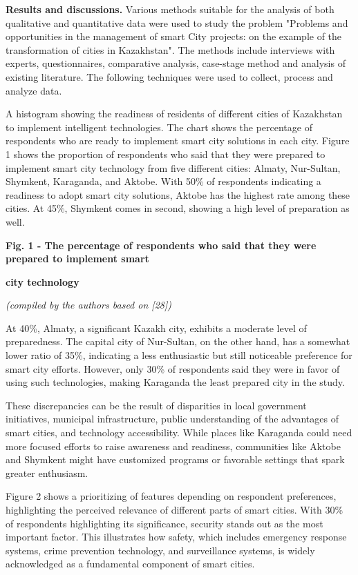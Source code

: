 {\bfseries Results and discussions.} Various methods suitable for the
analysis of both qualitative and quantitative data were used to study
the problem "Problems and opportunities in the management of smart City
projects: on the example of the transformation of cities in Kazakhstan".
The methods include interviews with experts, questionnaires, comparative
analysis, case-stage method and analysis of existing literature. The
following techniques were used to collect, process and analyze data.

A histogram showing the readiness of residents of different cities of
Kazakhstan to implement intelligent technologies. The chart shows the
percentage of respondents who are ready to implement smart city
solutions in each city. Figure 1 shows the proportion of respondents who
said that they were prepared to implement smart city technology from
five different cities: Almaty, Nur-Sultan, Shymkent, Karaganda, and
Aktobe. With 50\% of respondents indicating a readiness to adopt smart
city solutions, Aktobe has the highest rate among these cities. At 45\%,
Shymkent comes in second, showing a high level of preparation as well.

{\bfseries Fig. 1 - The percentage of respondents who said that they were
prepared to implement smart}

{\bfseries city technology}

\emph{(compiled by the authors based on {[}28{]})}

At 40\%, Almaty, a significant Kazakh city, exhibits a moderate level of
preparedness. The capital city of Nur-Sultan, on the other hand, has a
somewhat lower ratio of 35\%, indicating a less enthusiastic but still
noticeable preference for smart city efforts. However, only 30\% of
respondents said they were in favor of using such technologies, making
Karaganda the least prepared city in the study.

These discrepancies can be the result of disparities in local government
initiatives, municipal infrastructure, public understanding of the
advantages of smart cities, and technology accessibility. While places
like Karaganda could need more focused efforts to raise awareness and
readiness, communities like Aktobe and Shymkent might have customized
programs or favorable settings that spark greater enthusiasm.

Figure 2 shows a prioritizing of features depending on respondent
preferences, highlighting the perceived relevance of different parts of
smart cities. With 30\% of respondents highlighting its significance,
security stands out as the most important factor. This illustrates how
safety, which includes emergency response systems, crime prevention
technology, and surveillance systems, is widely acknowledged as a
fundamental component of smart cities.

